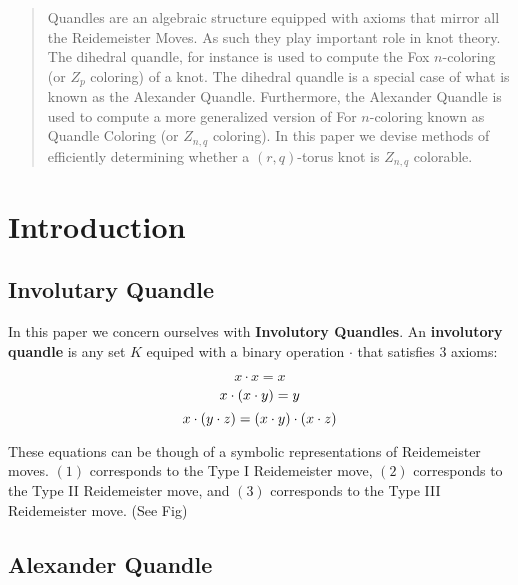 \documentclass[12pt]{article}
\begin{document}
\maketitle

\begin{abstract}
	Quandles are an algebraic structure equipped with axioms that mirror all the Reidemeister Moves. As such they play important role in knot theory. The dihedral quandle, for instance is used to compute the Fox $n$-coloring (or $Z_p$ coloring) of a knot. The dihedral quandle is a special case of what is known as the Alexander Quandle. Furthermore, the Alexander Quandle is used to compute a more generalized version of For $n$-coloring known as Quandle Coloring (or $Z_{n,q}$ coloring). In this paper we devise methods of efficiently determining whether a $(r,q)$-torus knot is $Z_{n,q}$ colorable.
\end{abstract}

\section{Introduction}
\subsection{Involutary Quandle}
In this paper we concern ourselves with \textbf{Involutory Quandles}. An \textbf{involutory quandle} is any set $K$ equiped with a binary operation $\cdot$ that satisfies $3$ axioms:

\begin{equation}
	x \cdot x = x
\end{equation}
\begin{equation}
	x \cdot (x \cdot y) = y \\
\end{equation}
\begin{equation}
	x \cdot (y \cdot z) = (x \cdot y) \cdot (x \cdot z) \\
\end{equation}

These equations can be though of a symbolic representations of Reidemeister moves. $(1)$ corresponds to the Type I Reidemeister move, $(2)$ corresponds to the Type II Reidemeister move, and $(3)$ corresponds to the Type III Reidemeister move. (See Fig)

\subsection{Alexander Quandle}
\end{document}
